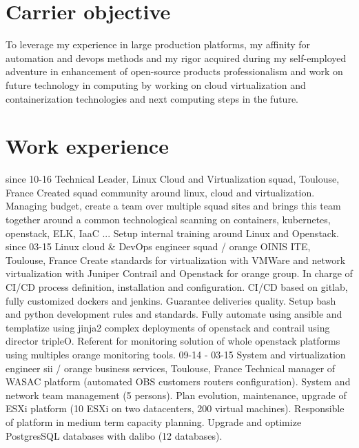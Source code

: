 \documentclass[]{friggeri-cv}
\begin{document}
\section{Carrier objective}
    To leverage my experience in large production platforms, my affinity
    for automation and devops methods and my rigor acquired during my self-employed
    adventure in enhancement of open-source products professionalism and work on future
    technology in computing by working on cloud virtualization and containerization
    technologies and next computing steps in the future.

\section{Work experience}
\begin{entrylist}
    \entry
        {since 10-16}
        {Technical Leader, Linux Cloud and Virtualization}
        {squad, Toulouse, France}
        {Created squad community around linux, cloud and virtualization. Managing budget, create a 
        team over multiple squad sites and brings this team together around a common technological 
        scanning on containers, kubernetes, openstack, ELK, IaaC ...
        Setup internal training around Linux and Openstack.
        }
    \entry
        {since 03-15}
        {Linux cloud \& DevOps engineer}
        {squad / orange OINIS ITE, Toulouse, France}
        {Create standards for virtualization with VMWare and network virtualization with Juniper 
        Contrail and Openstack for orange group. In charge of CI/CD process definition, 
        installation and configuration. CI/CD based on gitlab, fully customized dockers and jenkins.
        Guarantee deliveries quality. Setup bash and python development rules and standards.
        Fully automate using ansible and templatize using jinja2 complex deployments of openstack and
        contrail using director tripleO. Referent for monitoring solution of whole openstack platforms
        using multiples orange monitoring tools.
        }
    \entry
        {09-14 - 03-15}
        {System and virtualization engineer}
        {sii / orange business services, Toulouse, France}
        {Technical manager of WASAC platform (automated OBS customers routers configuration).
        System and network team management (5 persons).
        Plan evolution, maintenance, upgrade of ESXi platform (10 ESXi on two datacenters,
        200 virtual machines). 
        Responsible of platform in medium term capacity planning.
        Upgrade and optimize PostgresSQL databases with dalibo (12 databases).
}
\end{entrylist}
\end{document}
